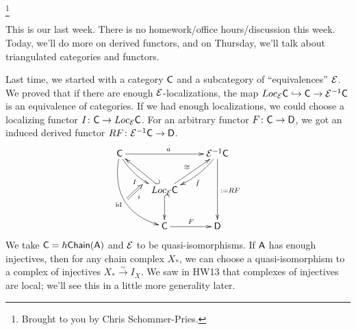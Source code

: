 \footnote{Brought to you by Chris Schommer-Pries.}

This is our last week. There is no homework/office hours/discussion this week. Today, we'll do more on derived functors, and on Thursday, we'll talk about triangulated categories and functors.

Last time, we started with a category $\text{\sf C}$ and a subcategory of ``equivalences'' $\mathcal{E}$. We proved that if there are enough $\mathcal{E}$-localizations, the map $Loc_{\mathcal{E}}\text{\sf C}\hookrightarrow \text{\sf C}\to \mathcal{E}^{-1}\text{\sf C}$ is an equivalence of categories. If we had enough localizations, we could choose a localizing functor $I\colon \text{\sf C}\to Loc_{\mathcal{E}} \text{\sf C}$. For an arbitrary functor $F\colon \text{\sf C}\to \text{\sf D}$, we got an induced derived functor $RF\colon \mathcal{E}^{-1}\text{\sf C}\to \text{\sf D}$.
\[\xymatrix{
 \C \ar@/_5ex/[ddr]_\id^{}="a" \ar[rr]^a \ar@/_/[dr]_I_-(.9){}="b" & & \E^{-1}\C \ar[dd]^{:=RF} \ar@/^/[dl]^{\tilde I}\\
  & Loc_\E \C\ar@{_(->}[ul] \ar[ur]^\cong \ar@{^(->}[d]\\
  & \C\ar[r]^F & \D
  \ar@{=>}_i "a";"b"
}\]
We take $\text{\sf C}=h\text{\sf Chain}(\text{\sf A})$ and $\mathcal{E}$ to be quasi-isomorphisms. If $\text{\sf A}$ has enough injectives, then for any chain complex $X_*$, we can choose a quasi-isomorphism to a complex of injectives $X_*\xrightarrow\sim I_X$. We saw in HW13 that complexes of injectives are local; we'll see this in a little more generality later.

